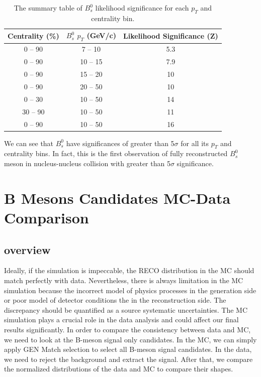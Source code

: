 \begin{table}[h]
\begin{center}
\caption{The summary table of $B^0_s$ likelihood significance for each $p_T$ and centrality bin.}
\vspace{1em}
\label{BsSig}
  \begin{tabular}{ |c|c|c|}
    \hline 
Centrality (\%) & $B^0_s$ $p_T$ (GeV/c) & Likelihood Significance (Z)  \\
     \hline
0 -- 90 & 7 -- 10 & 5.3 \\
0 -- 90 & 10 -- 15 & 7.9 \\
0 -- 90 & 15 -- 20 & 10 \\
0 -- 90 & 20 -- 50 & 10 \\
0 -- 30 & 10 -- 50 &  14 \\
30 -- 90 & 10 -- 50 &  11\\
0 -- 90 & 10 -- 50 & 16 \\
     \hline
    \hline
\end{tabular}
\end{center}
\end{table}



We can see that $B^0_s$ have significances of greater than 5$\sigma$ for all its $p_T$ and centrality bins. In fact, this is the first observation of fully reconstructed $B^0_s$ meson in nucleus-nucleus collision with greater than 5$\sigma$ significance. 

\section{B Mesons Candidates MC-Data Comparison}

\subsection{overview}

Ideally, if the simulation is impeccable, the RECO distribution in the MC should match perfectly with data. Nevertheless, there is always limitation in the MC simulation because the incorrect model of physics processes in the generation side or poor model of detector conditions the in the reconstruction side. The discrepancy should be quantified as a source systematic uncertainties. The MC simulation plays a crucial role in the data analysis and could affect our final results significantly. In order to compare the consistency between data and MC, we need to look at the B-meson signal only candidates. In the MC, we can simply apply GEN Match selection to select all B-meson signal candidates. In the data, we need to reject the background and extract the signal. After that, we compare the normalized distributions of the data and MC to compare their shapes. 

